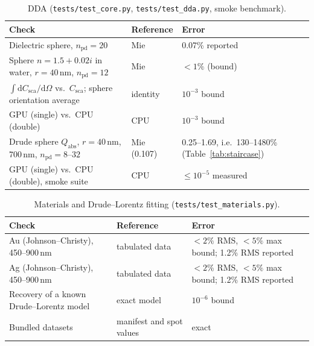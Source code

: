 \documentclass[11pt]{article}
\newcommand{\code}[1]{\texttt{#1}}
\newcommand{\npd}{n_\mathrm{pd}}
\newcommand{\Qabs}{Q_\mathrm{abs}}
\begin{document}
\begin{table}[ht]
\centering\small
\begin{tabularx}{\linewidth}{@{}Xll@{}}
\toprule
Check & Reference & Error \\
\midrule
Dielectric sphere, $\npd=20$ & Mie & 0.07\% reported \\
Sphere $n=1.5+0.02i$ in water, $r=40$\,nm, $\npd=12$ & Mie & $<1\%$ (bound) \\
$\int \mathrm{d}C_\mathrm{sca}/\mathrm{d}\Omega$ vs.\ $C_\mathrm{sca}$; sphere orientation average & identity & $10^{-3}$ bound \\
GPU (single) vs.\ CPU (double) & CPU & $10^{-3}$ bound \\
Drude sphere $\Qabs$, $r=40$\,nm, 700\,nm, $\npd=8$--$32$ & Mie (0.107) & 0.25--1.69, i.e.\ 130--1480\% (Table~\ref{tab:staircase}) \\
GPU (single) vs.\ CPU (double), smoke suite & CPU & $\le10^{-5}$ measured \\
\bottomrule
\end{tabularx}
\caption{DDA (\code{tests/test\_core.py}, \code{tests/test\_dda.py}, smoke benchmark).}
\label{tab:val-dda}
\end{table}

\begin{table}[ht]
\centering\small
\begin{tabularx}{\linewidth}{@{}Xll@{}}
\toprule
Check & Reference & Error \\
\midrule
Au (Johnson--Christy), 450--900\,nm & tabulated data & $<2\%$ RMS, $<5\%$ max bound; 1.2\% RMS reported \\
Ag (Johnson--Christy), 450--900\,nm & tabulated data & $<2\%$ RMS, $<5\%$ max bound; 1.2\% RMS reported \\
Recovery of a known Drude--Lorentz model & exact model & $10^{-6}$ bound \\
Bundled datasets & manifest and spot values & exact \\
\bottomrule
\end{tabularx}
\caption{Materials and Drude--Lorentz fitting (\code{tests/test\_materials.py}).}
\label{tab:val-mat}
\end{table}
\end{document}
